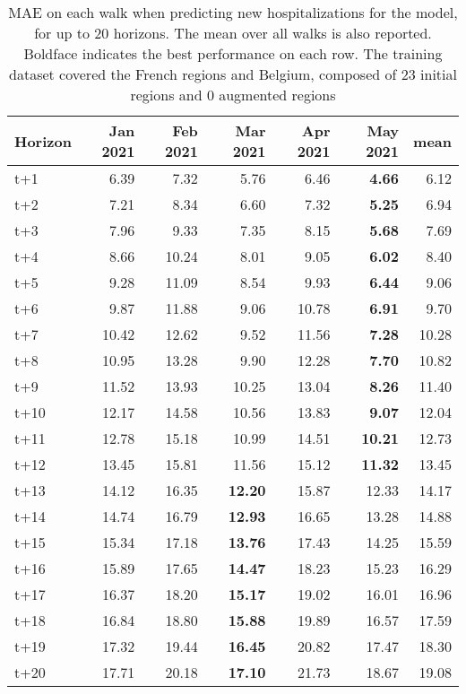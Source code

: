 \begin{table}[H]
\centering
\caption{MAE on each walk when predicting new hospitalizations for the model, for up to 20 horizons. The mean over all walks is also reported. Boldface indicates the best performance on each row. The training dataset covered the French regions and Belgium, composed of 23 initial regions and 0 augmented regions }
\label{tab:MAE_walk_custom_linear_regression}
\begin{tabular}{lrrrrrr}
\toprule
Horizon &  Jan 2021 &  Feb 2021 &  Mar 2021 &  Apr 2021 &  May 2021 &  mean \\
\midrule
t+1  & 6.39  & 7.32  & 5.76  & 6.46  & \textbf{4.66}  & 6.12  \\
t+2  & 7.21  & 8.34  & 6.60  & 7.32  & \textbf{5.25}  & 6.94  \\
t+3  & 7.96  & 9.33  & 7.35  & 8.15  & \textbf{5.68}  & 7.69  \\
t+4  & 8.66  & 10.24  & 8.01  & 9.05  & \textbf{6.02}  & 8.40  \\
t+5  & 9.28  & 11.09  & 8.54  & 9.93  & \textbf{6.44}  & 9.06  \\
t+6  & 9.87  & 11.88  & 9.06  & 10.78  & \textbf{6.91}  & 9.70  \\
t+7  & 10.42  & 12.62  & 9.52  & 11.56  & \textbf{7.28}  & 10.28  \\
t+8  & 10.95  & 13.28  & 9.90  & 12.28  & \textbf{7.70}  & 10.82  \\
t+9  & 11.52  & 13.93  & 10.25  & 13.04  & \textbf{8.26}  & 11.40  \\
t+10  & 12.17  & 14.58  & 10.56  & 13.83  & \textbf{9.07}  & 12.04  \\
t+11  & 12.78  & 15.18  & 10.99  & 14.51  & \textbf{10.21}  & 12.73  \\
t+12  & 13.45  & 15.81  & 11.56  & 15.12  & \textbf{11.32}  & 13.45  \\
t+13  & 14.12  & 16.35  & \textbf{12.20}  & 15.87  & 12.33  & 14.17  \\
t+14  & 14.74  & 16.79  & \textbf{12.93}  & 16.65  & 13.28  & 14.88  \\
t+15  & 15.34  & 17.18  & \textbf{13.76}  & 17.43  & 14.25  & 15.59  \\
t+16  & 15.89  & 17.65  & \textbf{14.47}  & 18.23  & 15.23  & 16.29  \\
t+17  & 16.37  & 18.20  & \textbf{15.17}  & 19.02  & 16.01  & 16.96  \\
t+18  & 16.84  & 18.80  & \textbf{15.88}  & 19.89  & 16.57  & 17.59  \\
t+19  & 17.32  & 19.44  & \textbf{16.45}  & 20.82  & 17.47  & 18.30  \\
t+20  & 17.71  & 20.18  & \textbf{17.10}  & 21.73  & 18.67  & 19.08  \\

\bottomrule
\end{tabular}
\end{table}
